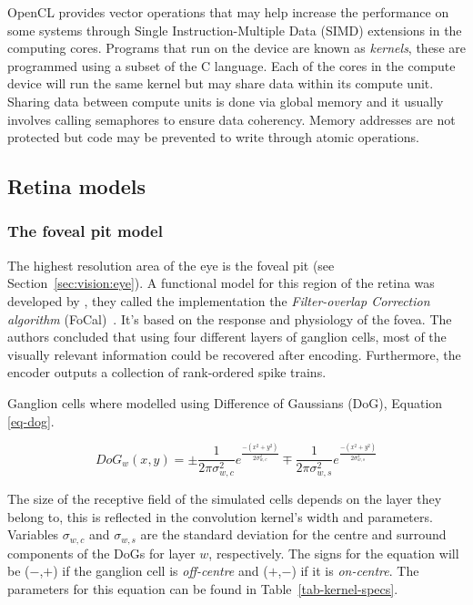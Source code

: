 OpenCL provides vector operations that may help increase the performance on some systems through Single Instruction-Multiple Data (SIMD) extensions in the computing cores. Programs that run on the device are known as \emph{kernels}, these are programmed using a subset of the C language. Each of the cores in the compute device will run the same kernel but may share data within its compute unit. Sharing data between compute units is done via global memory and it usually involves calling semaphores to ensure data coherency. Memory addresses are not protected but code may be prevented to write through atomic operations.

\subsection{Retina models}
\subsubsection{The foveal pit model}

The highest resolution area of the eye is the foveal pit (see Section~\ref{sec:vision:eye}). A functional model for this region of the retina was developed by \citeauthor{basab-model}, they called the implementation the \emph{Filter-overlap Correction algorithm} (FoCal)~\cite{basab-model}. It's based on the response and physiology of the fovea. The authors concluded that using four different layers of ganglion cells, most of the visually relevant information could be recovered after encoding. Furthermore, the encoder outputs a collection of rank-ordered spike trains. 

Ganglion cells where modelled using Difference of Gaussians (DoG), Equation \ref{eq-dog}. 

\begin{equation}
\label{eq-dog}
DoG_w(x,y) = \pm\frac{1}{2\pi\sigma_{w,c}^2}e^{\frac{-(x^2 + y^2)}{2\sigma_{w,c}^2}}
\mp\frac{1}{2\pi\sigma_{w,s}^2}e^{\frac{-(x^2 + y^2)}{2\sigma_{w,s}^2}}
\end{equation}

The size of the receptive field of the simulated cells depends on the layer they belong to, this is reflected in the convolution kernel's width and parameters. Variables $\sigma_{w,c}$ and $\sigma_{w,s}$ are the standard deviation for the centre and surround components of the DoGs for layer $w$, respectively. The signs for the equation will be ($-$,$+$) if the ganglion cell is \emph{off-centre} and ($+$,$-$) if it is \emph{on-centre}. The parameters for this equation can be found in Table~\ref{tab-kernel-specs}.

